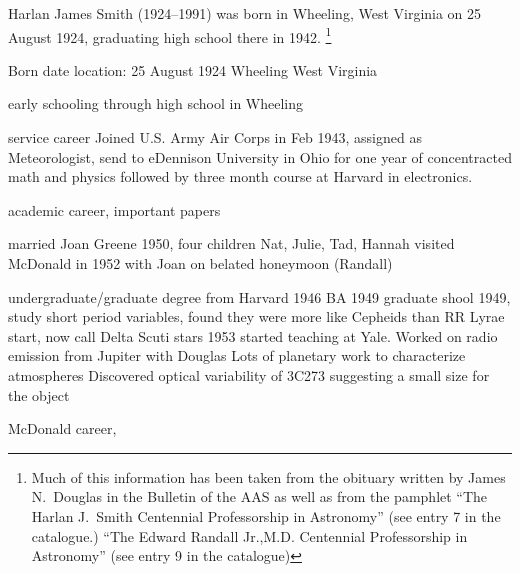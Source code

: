 

Harlan James Smith (1924--1991) was born in Wheeling, West Virginia on
25 August 1924, graduating high school there in 1942.
\footnote{Much of this information has been
taken from the obituary written by James N.~Douglas in the Bulletin of
the AAS\cite{Douglas1992Harlan} as well as from the pamphlet ``The
Harlan J.~Smith Centennial Professorship in Astronomy'' (see entry
7 in the catalogue.) ``The Edward Randall Jr.,M.D. Centennial Professorship
in Astronomy'' (see entry 9 in the catalogue)} 

Born date location:  25 August 1924 Wheeling West Virginia

early schooling through high school in Wheeling

service career
Joined U.S. Army Air Corps in Feb 1943, assigned as Meteorologist,
send to eDennison University in Ohio for one year of concentracted
math and physics followed by three month course at Harvard in electronics.


academic career, important papers

married Joan Greene 1950, four children Nat, Julie, Tad, Hannah
visited McDonald in 1952 with Joan on belated honeymoon  (Randall)

undergraduate/graduate degree from Harvard 1946 BA 1949 graduate shool
1949, study short period variables, found they were more like Cepheids
than RR Lyrae start, now call Delta Scuti
stars\cite{1955PhDT.........2S} 1953 started teaching at Yale.
Worked on radio emission from Jupiter with Douglas
Lots of planetary work to characterize atmospheres
Discovered optical variability of 3C273\cite{1963Natur.198..650S}
suggesting a small size for the object

McDonald career,

